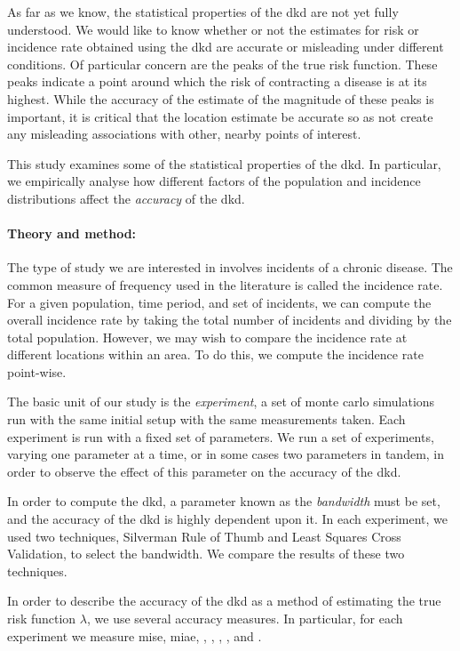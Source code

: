 \begin{onehalfspace}
As far as we know,
the statistical properties of the \acrlong{dkd} are not yet fully understood.
We would like to know whether or not the estimates for \gls{risk} or \gls{incidence rate}
obtained using the \acrlong{dkd} are accurate or misleading under different conditions.
Of particular concern are the peaks of the true risk function.
These peaks indicate a point around which the risk of contracting a disease is at its highest.
While the accuracy of the estimate of the magnitude of these peaks is important,
it is critical that the location estimate be accurate so as not create any misleading associations
with other, nearby points of interest.

This study examines some of the statistical properties of the \acrlong{dkd}.
In particular,
we empirically analyse how different factors of the population and incidence distributions
affect the \textit{accuracy} of the \acrlong{dkd}.

\paragraph*{Theory and method:}

The type of study we are interested in involves incidents of a chronic disease.
The common measure of frequency used in the literature is called the incidence rate.
For a given population, time period, and set of incidents,
we can compute the overall incidence rate by taking the total number of incidents and dividing by the total population.
However, we may wish to compare the incidence rate at different locations within an area.
To do this, we compute the incidence rate point-wise.

The basic unit of our study is the \textit{experiment},
a set of monte carlo simulations run with the same initial setup with the same measurements taken.
Each experiment is run with a fixed set of parameters.
We run a set of experiments,
varying one parameter at a time, or in some cases two parameters in tandem,
in order to observe the effect of this parameter on the accuracy of the \acrlong{dkd}.

In order to compute the \acrlong{dkd},
a parameter known as the \textit{bandwidth} must be set,
and the accuracy of the \acrlong{dkd} is highly dependent upon it.
In each experiment,
we used two techniques,
Silverman Rule of Thumb and Least Squares Cross Validation,
to select the bandwidth.
We compare the results of these two techniques.

In order to describe the accuracy of the \acrlong{dkd} as a method of estimating the true risk function $\lambda$,
we use several accuracy measures.
In particular,
for each experiment we measure \acrlong{mise},
\acrlong{miae},
,
,
,
,
and .


\end{onehalfspace}
